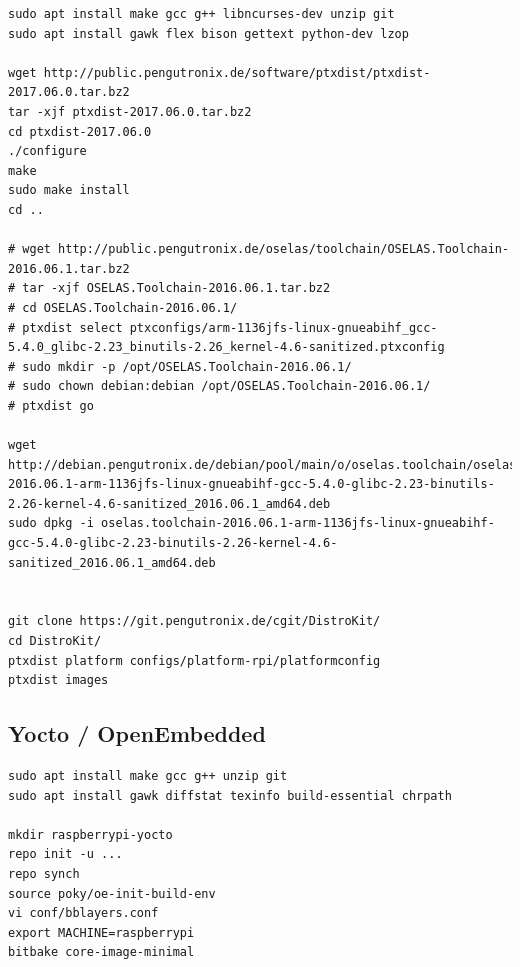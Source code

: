 \documentclass[printmode]{mgr}
\begin{document}



\begin{lstlisting}
sudo apt install make gcc g++ libncurses-dev unzip git
sudo apt install gawk flex bison gettext python-dev lzop

wget http://public.pengutronix.de/software/ptxdist/ptxdist-2017.06.0.tar.bz2
tar -xjf ptxdist-2017.06.0.tar.bz2
cd ptxdist-2017.06.0
./configure
make
sudo make install
cd ..

# wget http://public.pengutronix.de/oselas/toolchain/OSELAS.Toolchain-2016.06.1.tar.bz2
# tar -xjf OSELAS.Toolchain-2016.06.1.tar.bz2
# cd OSELAS.Toolchain-2016.06.1/
# ptxdist select ptxconfigs/arm-1136jfs-linux-gnueabihf_gcc-5.4.0_glibc-2.23_binutils-2.26_kernel-4.6-sanitized.ptxconfig
# sudo mkdir -p /opt/OSELAS.Toolchain-2016.06.1/
# sudo chown debian:debian /opt/OSELAS.Toolchain-2016.06.1/
# ptxdist go

wget http://debian.pengutronix.de/debian/pool/main/o/oselas.toolchain/oselas.toolchain-2016.06.1-arm-1136jfs-linux-gnueabihf-gcc-5.4.0-glibc-2.23-binutils-2.26-kernel-4.6-sanitized_2016.06.1_amd64.deb
sudo dpkg -i oselas.toolchain-2016.06.1-arm-1136jfs-linux-gnueabihf-gcc-5.4.0-glibc-2.23-binutils-2.26-kernel-4.6-sanitized_2016.06.1_amd64.deb


git clone https://git.pengutronix.de/cgit/DistroKit/
cd DistroKit/
ptxdist platform configs/platform-rpi/platformconfig
ptxdist images
\end{lstlisting}

\subsection{Yocto / OpenEmbedded}

\begin{lstlisting}
sudo apt install make gcc g++ unzip git
sudo apt install gawk diffstat texinfo build-essential chrpath

mkdir raspberrypi-yocto
repo init -u ...
repo synch
source poky/oe-init-build-env
vi conf/bblayers.conf
export MACHINE=raspberrypi
bitbake core-image-minimal
\end{lstlisting}
\end{document}
